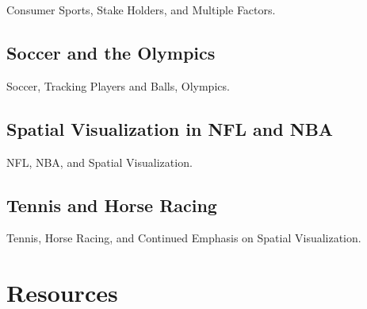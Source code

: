 Consumer Sports, Stake Holders, and Multiple Factors.




\subsection{Soccer and the Olympics}\label{soccer-and-the-olympics}

Soccer, Tracking Players and Balls, Olympics.





\subsection{Spatial Visualization in NFL and
NBA}\label{spatial-visualization-in-nfl-and-nba}

NFL, NBA, and Spatial Visualization.





\subsection{Tennis and Horse Racing}\label{tennis-and-horse-racing}

Tennis, Horse Racing, and Continued Emphasis on Spatial Visualization.




\section{Resources}\label{resources-2}

